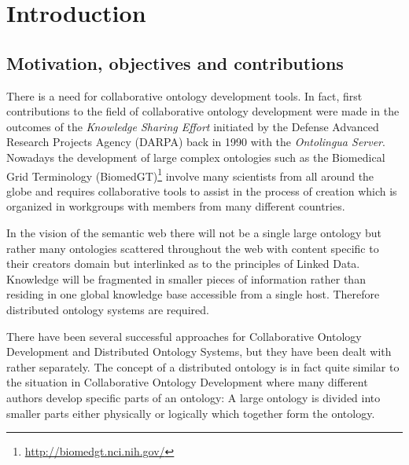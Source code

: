 \chapter{Introduction}
\label{chapter_einfuehrung}



\section{Motivation, objectives and contributions}
\label{section_motivation}
There is a need for collaborative ontology development tools.
In fact, first contributions to the field of collaborative
ontology development were made in the outcomes of the
\emph{Knowledge Sharing Effort} initiated by the Defense Advanced
Research Projects Agency (DARPA) back in 1990 with the \emph{Ontolingua Server}.
Nowadays the development of large complex ontologies such as the Biomedical Grid 
Terminology (BiomedGT)\footnote{\url{http://biomedgt.nci.nih.gov/}}
involve many scientists from all around the globe and requires collaborative
tools to assist in the process of creation which is organized in workgroups
with members from many different countries.

In the vision of the semantic web \cite{berners-lee01} there will not be a single large ontology
but rather many ontologies scattered throughout the web with content
specific to their creators domain but interlinked as to the principles of
Linked Data.
Knowledge will be fragmented in smaller pieces of information rather than
residing in one global knowledge base accessible from a single host.
Therefore distributed ontology systems are required.


There have been several successful approaches for Collaborative Ontology
Development and Distributed Ontology Systems, but they have been dealt with rather separately.
The concept of a distributed ontology is in fact quite similar to the
situation in Collaborative Ontology Development where many different authors
develop specific parts of an ontology: A large ontology is divided into
smaller parts either physically or logically which together form the ontology.

